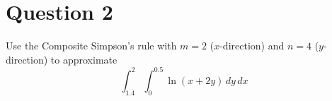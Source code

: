 \section{Question 2}

\begin{question}
    Use the Composite Simpson's rule with $m=2$ ($x$-direction) and $n=4$ ($y$-direction) to approximate
    \begin{equation}
        \int_{1.4}^2 \int_{0}^{0.5} \ln (x+2y) \, dy \, dx
    \end{equation}
\end{question}

\begin{answer}
    
\end{answer}